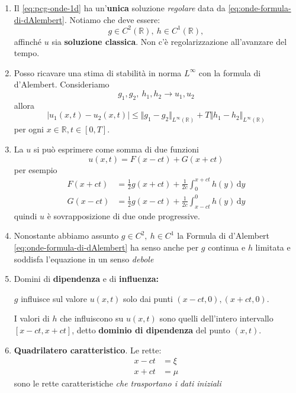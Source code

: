 \documentclass[10pt,a4paper,twoside,openright]{book}
\newcommand{\de}{\,\mathrm d}
\newcommand{\dy}{\de y}
\begin{document}
\begin{enumerate}
	\item Il \eqref{eq:pcg-onde-1d} ha un'\textbf{unica} soluzione \textit{regolare} data da \eqref{eq:onde-formula-di-dAlembert}. Notiamo che deve essere:
		\begin{equation*}
			g\in C^{2}(\mathbb{R}) ,\ h\in C^{1}(\mathbb{R}) ,
		\end{equation*}
		affinché $u$ sia\textbf{ soluzione classica}. Non c'è regolarizzazione all'avanzare del tempo.
	\item Posso ricavare una stima di stabilità in norma $\displaystyle L^{\infty }$ con la formula di d'Alembert. Consideriamo
		\begin{equation*}
			g_{1} ,g_{2} ,\ h_{1} ,h_{2}\rightarrow u_{1} ,u_{2}
		\end{equation*}
		allora
		\begin{equation*}
			| u_{1}(x,t) -u_{2}(x,t)| \leqslant \Vert g_{1} -g_{2}\Vert _{L^{\infty }(\mathbb{R})} +T\Vert h_{1} -h_{2}\Vert _{L^{\infty }(\mathbb{R})}
		\end{equation*}
		per ogni $x\in \mathbb{R}, t\in [0,T]$.
	\item La $u$ si può esprimere come somma di due funzioni
		\begin{equation*}
			u(x,t) =F(x-ct) +G(x+ct)
		\end{equation*}
		per esempio
		\begin{align*}
			F(x+ct) & =\frac{1}{2} g(x+ct) +\frac{1}{2c}\int _{0}^{x+ct} h(y) \dy \\
			G(x-ct) & =\frac{1}{2} g(x-ct) +\frac{1}{2c}\int _{x-ct}^{0} h(y) \dy 
		\end{align*}
		quindi $u$ è sovrapposizione di due onde progressive.
	\item Nonostante abbiamo assunto $\displaystyle g\in C^{2} ,\ h\in C^{1}$ la Formula di d'Alembert \eqref{eq:onde-formula-di-dAlembert} ha senso anche per $g$ continua e $h$ limitata e soddisfa l'equazione in un senso \textit{debole}
			
	\item Domini di \textbf{dipendenza} e di \textbf{influenza:}
			
			
			$g$ influisce sul valore $\displaystyle u(x,t)$ solo dai punti $\displaystyle (x-ct,0) ,(x+ct,0)$.
			
			I valori di $h$ che influiscono su $\displaystyle u(x,t)$ sono quelli dell'intero intervallo $\displaystyle [ x-ct,x+ct]$, detto \textbf{dominio di dipendenza }del punto $\displaystyle (x,t)$.
	\item \textbf{Quadrilatero caratteristico}. Le rette:
		\begin{align*}
			x-ct & =\xi \\
			x+ct & =\mu 
		\end{align*}
		sono le rette caratteristiche \emph{che trasportano i dati iniziali}
		\begin{figure}[htpb]
			\centering


\end{figure}
\end{enumerate}
\end{document}
